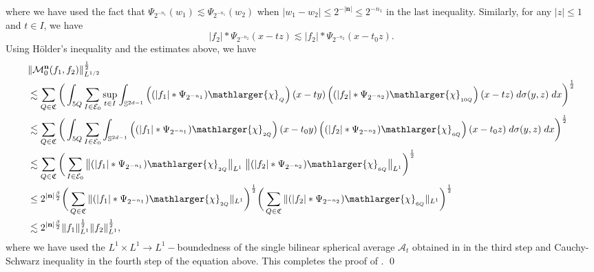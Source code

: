 \documentclass[a4paper,reqno]{amsart}
\newcounter{old}
\numberwithin{equation}{section}
\begin{document}
	where we have used the fact that $\Psi_{2^{-n_1}}(w_1)\lesssim\Psi_{2^{-n_1}}(w_2)$ when $|w_1-w_2|\leq2^{-|\mathbf{n}|}\leq 2^{-n_1}$ in the last inequality. Similarly, for any $|z|\leq1$ and $t\in I$, we have 
	\[|f_2|*\Psi_{2^{-n_2}}(x-tz)\lesssim|f_2|*\Psi_{2^{-n_2}}(x-t_0z).\]
	Using H\"older's inequality and the estimates above, we have
	\begin{align*}
		&\|\mathcal{M}^{\mathbf{n}}_0(f_1,f_2)\|_{L^{1/2}}^\frac{1}{2}\\
		&\lesssim\sum_{Q\in\mathfrak{C}}\bigg(\int_{5Q}\sum_{I\in\mathcal{E}_0}\sup_{t\in I}\int_{\mathbb S^{2d-1}}\left((|f_1|*\Psi_{2^{-n_1}})\mathlarger{\chi}_{_{Q}}\right)(x-ty)\left(( |f_2|*\Psi_{2^{-n_2}})\mathlarger{\chi}_{_{10Q}}\right)(x-tz)\;d\sigma(y,z)\;dx\bigg)^\frac{1}{2}\\
		&\lesssim\sum_{Q\in\mathfrak{C}}\bigg(\int_{5Q}\sum_{I\in\mathcal{E}_0}\int_{\mathbb S^{2d-1}}\left((|f_1|*\Psi_{2^{-n_1}})\mathlarger{\chi}_{_{2Q}}\right)(x-t_0y)\left(( |f_2|*\Psi_{2^{-n_2}})\mathlarger{\chi}_{_{6Q}}\right)(x-t_0z)\;d\sigma(y,z)\;dx\bigg)^\frac{1}{2}\\
		&\lesssim\sum_{Q\in\mathfrak{C}}\bigg(\sum_{I\in\mathcal{E}_0}\big\|(|f_1|*\Psi_{2^{-n_1}})\mathlarger{\chi}_{_{2Q}}\big\|_{L^1}\;\big\|( |f_2|*\Psi_{2^{-n_2}})\mathlarger{\chi}_{_{6Q}}\big\|_{L^1}\bigg)^\frac{1}{2}\\
		&\leq2^{|\mathbf{n}|\frac{\beta}{2}}\bigg(\sum_{Q\in\mathfrak{C}}\|(|f_1|*\Psi_{2^{-n_1}})\mathlarger{\chi}_{_{2Q}}\|_{L^1}\bigg)^\frac{1}{2}\bigg(\sum_{Q\in\mathfrak{C}}\|(|f_2|*\Psi_{2^{-n_2}})\mathlarger{\chi}_{_{6Q}}\|_{L^1}\bigg)^\frac{1}{2}\\
		&\lesssim2^{|\mathbf{n}|\frac{\beta}{2}}\|f_1\|_{L^1}^\frac{1}{2}\|f_2\|_{L^1}^\frac{1}{2},
	\end{align*}
	where we have used the $L^1\times L^1\to L^1-$boundedness of the single bilinear spherical average $\mathcal A_t$ obtained in \cite{IPS} in the third step and Cauchy-Schwarz inequality in the fourth step of the equation above. This completes the proof of .
	\qed
	
\end{document}
